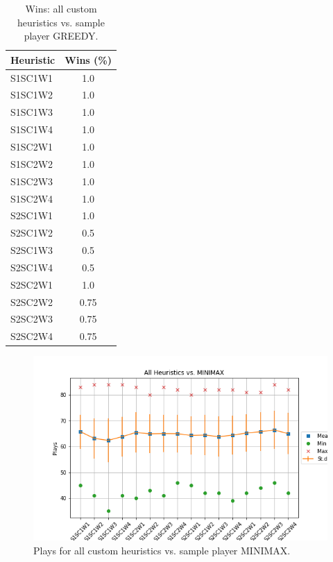 \documentclass[a4paper]{article}
\begin{document}
    \begin{table}[htpb]
    \caption{ Wins: all custom heuristics vs. sample player GREEDY.}
    \centering
    \begin{tabular}{ l | c }
    Heuristic & Wins (\%) \\ \hline 
    S1SC1W1 & 1.0 \\
    S1SC1W2 & 1.0 \\
    S1SC1W3 & 1.0 \\
    S1SC1W4 & 1.0 \\
    S1SC2W1 & 1.0 \\
    S1SC2W2 & 1.0 \\
    S1SC2W3 & 1.0 \\
    S1SC2W4 & 1.0 \\
    S2SC1W1 & 1.0 \\
    S2SC1W2 & 0.5 \\
    S2SC1W3 & 0.5 \\
    S2SC1W4 & 0.5 \\
    S2SC2W1 & 1.0 \\
    S2SC2W2 & 0.75 \\
    S2SC2W3 & 0.75 \\
    S2SC2W4 & 0.75 
    \end{tabular}
    \label{tabwinsGREEDY}
    \end{table}

    


\begin{figure}[htpb]
\begin{center}
\includegraphics[width=1\columnwidth]{fig/results_Plays_All_vs_MINIMAX.png}
\caption{Plays for all custom heuristics vs. sample player MINIMAX.}
\end{center}
\label{figplyesMINIMAX}
\end{figure}
    
\end{document}
